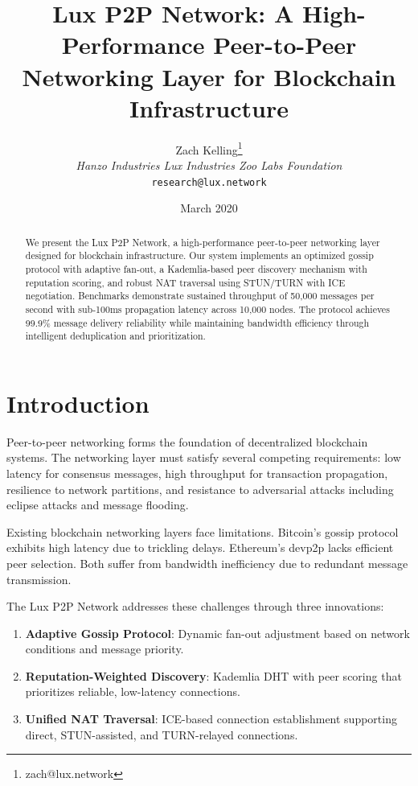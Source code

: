 \documentclass[11pt,a4paper]{article}
\title{Lux P2P Network: A High-Performance Peer-to-Peer\\Networking Layer for Blockchain Infrastructure}
\author{Zach Kelling\thanks{zach@lux.network} \\ \textit{Hanzo Industries \quad Lux Industries \quad Zoo Labs Foundation} \\ \texttt{research@lux.network}}
\date{March 2020}
\begin{document}
\maketitle

\begin{abstract}
We present the Lux P2P Network, a high-performance peer-to-peer networking layer designed for blockchain infrastructure. Our system implements an optimized gossip protocol with adaptive fan-out, a Kademlia-based peer discovery mechanism with reputation scoring, and robust NAT traversal using STUN/TURN with ICE negotiation. Benchmarks demonstrate sustained throughput of 50,000 messages per second with sub-100ms propagation latency across 10,000 nodes. The protocol achieves 99.9\% message delivery reliability while maintaining bandwidth efficiency through intelligent deduplication and prioritization.
\end{abstract}

\section{Introduction}

Peer-to-peer networking forms the foundation of decentralized blockchain systems. The networking layer must satisfy several competing requirements: low latency for consensus messages, high throughput for transaction propagation, resilience to network partitions, and resistance to adversarial attacks including eclipse attacks and message flooding.

Existing blockchain networking layers face limitations. Bitcoin's gossip protocol exhibits high latency due to trickling delays. Ethereum's devp2p lacks efficient peer selection. Both suffer from bandwidth inefficiency due to redundant message transmission.

The Lux P2P Network addresses these challenges through three innovations:

\begin{enumerate}
    \item \textbf{Adaptive Gossip Protocol}: Dynamic fan-out adjustment based on network conditions and message priority.
    \item \textbf{Reputation-Weighted Discovery}: Kademlia DHT with peer scoring that prioritizes reliable, low-latency connections.
    \item \textbf{Unified NAT Traversal}: ICE-based connection establishment supporting direct, STUN-assisted, and TURN-relayed connections.
\end{enumerate}
\end{document}
